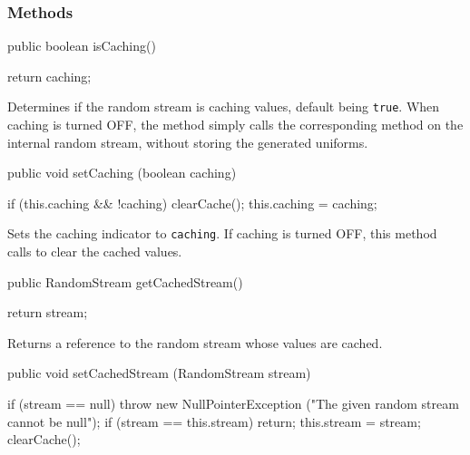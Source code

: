 \subsubsection* {Methods}
\begin{code}

   public boolean isCaching()\begin{hide} {
      return caching;
   }\end{hide}
\end{code}
\begin{tabb}   Determines if the random stream is caching values,
 default being \texttt{true}.
 When caching is turned OFF, the 
 method simply calls the corresponding method on the internal
 random stream, without storing the generated uniforms.
\end{tabb}
\begin{htmlonly}
\end{htmlonly}
\begin{code}

   public void setCaching (boolean caching)\begin{hide} {
      if (this.caching && !caching)
         clearCache();
      this.caching = caching;
   }\end{hide}
\end{code}
\begin{tabb}   Sets the caching indicator to \texttt{caching}.
 If caching is turned OFF, this method calls 
 to clear the cached values.
\end{tabb}
\begin{htmlonly}
\end{htmlonly}
\begin{code}

   public RandomStream getCachedStream()\begin{hide} {
      return stream;
   }\end{hide}
\end{code}
\begin{tabb}   Returns a reference to the random stream
 whose values are cached.
\end{tabb}
\begin{htmlonly}
\end{htmlonly}
\begin{code}

   public void setCachedStream (RandomStream stream)\begin{hide} {
      if (stream == null)
         throw new NullPointerException
            ("The given random stream cannot be null");
      if (stream == this.stream)
         return;
      this.stream = stream;
      clearCache();
   }\end{hide}
\end{code}
